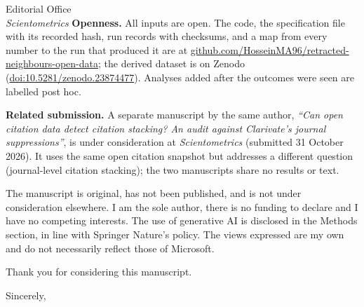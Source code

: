 \documentclass[10pt]{letter}
\begin{document}
\begin{letter}{Editorial Office\\\emph{Scientometrics}}
\textbf{Openness.} All inputs are open. The code, the specification file with its recorded hash, run records with
checksums, and a map from every number to the run that produced it are at
\mbox{\href{https://github.com/HosseinMA96/retracted-neighbours-open-data}{github.com/HosseinMA96/retracted-neighbours-open-data}}; the derived dataset is on Zenodo
(\mbox{\href{https://doi.org/10.5281/zenodo.23874477}{doi:10.5281/zenodo.23874477}}). Analyses added after the outcomes were seen are labelled post hoc.

\textbf{Related submission.} A separate manuscript by the same author, \emph{``Can open citation data detect
citation stacking? An audit against Clarivate's journal suppressions''}, is under consideration at
\emph{Scientometrics} (submitted 31 October 2026). It uses the same open citation snapshot but addresses a different
question (journal-level citation stacking); the two manuscripts share no results or text.

The manuscript is original, has not been published, and is not under consideration elsewhere. I am the sole author,
there is no funding to declare and I have no competing interests. The use of generative AI is disclosed in the
Methods section, in line with Springer Nature's policy. The views expressed are my own and do not necessarily reflect
those of Microsoft.

Thank you for considering this manuscript.

\closing{Sincerely,}
\end{letter}
\end{document}
